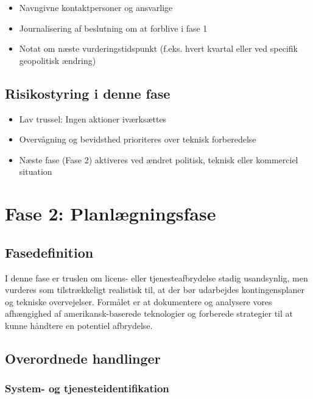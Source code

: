\documentclass[a4paper,11pt,oneside]{book}
\def\tightlist{}
\begin{document}
\begin{itemize}
\tightlist
\item
  Navngivne kontaktpersoner og ansvarlige
\item
  Journalisering af beslutning om at forblive i fase 1
\item
  Notat om næste vurderingstidspunkt (f.eks. hvert kvartal eller ved
  specifik geopolitisk ændring)
\end{itemize}

\section{Risikostyring i denne fase}\label{risikostyring-i-denne-fase}

\begin{itemize}
\tightlist
\item
  Lav trussel: Ingen aktioner iværksættes
\item
  Overvågning og bevidsthed prioriteres over teknisk forberedelse
\item
  Næste fase (Fase 2) aktiveres ved ændret politisk, teknisk eller
  kommerciel situation
\end{itemize}

\newpage

\chapter{Fase 2: Planlægningsfase}\label{fase-2-planluxe6gningsfase}

\section{Fasedefinition}\label{fasedefinition}

I denne fase er truslen om licens- eller tjenesteafbrydelse stadig
usandsynlig, men vurderes som tilstrækkeligt realistisk til, at der bør
udarbejdes kontingensplaner og tekniske overvejelser. Formålet er at
dokumentere og analysere vores afhængighed af amerikansk-baserede
teknologier og forberede strategier til at kunne håndtere en potentiel
afbrydelse.

\section{Overordnede handlinger}\label{overordnede-handlinger}

\subsection{System- og
tjenesteidentifikation}\label{system--og-tjenesteidentifikation}
\end{document}
